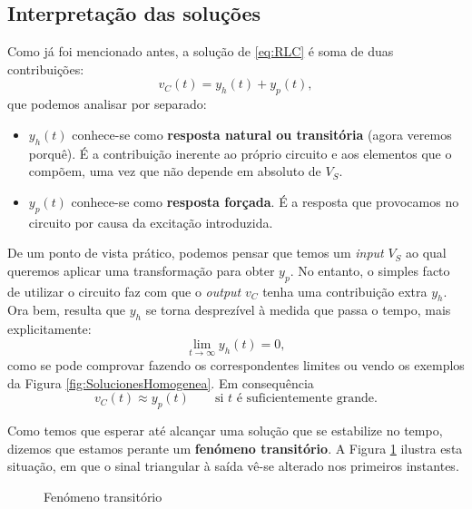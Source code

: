 \subsection{Interpretação  das soluções}
Como já foi mencionado antes, a solução de \eqref{eq:RLC} é soma de duas contribuições:
\[
v_C(t) = y_h(t) + y_p(t),
\]
que podemos analisar por separado:
\begin{itemize}
  \item $y_h(t)$ conhece-se como \textbf{resposta natural ou transitória} (agora veremos porquê). É a contribuição inerente ao próprio circuito e aos elementos que o compõem, uma vez que não depende em absoluto de $V_S$.
  \item $y_p(t)$ conhece-se como \textbf{resposta forçada}. É a resposta que provocamos no circuito por causa da excitação introduzida.
\end{itemize}
De um ponto de vista prático, podemos pensar que temos um \textit{input} $V_S$ ao qual queremos aplicar uma transformação para obter $y_p$. No entanto, o simples facto de utilizar o circuito faz com que o \textit{output} $v_C$ tenha uma contribuição extra $y_h$. Ora bem, resulta que $y_h$ se torna desprezível à medida que passa o tempo, mais explicitamente:
\[
\lim _{t\rightarrow \infty} y_h (t) = 0,
\]
como se pode comprovar fazendo os correspondentes limites ou vendo os exemplos da Figura \ref{fig:SolucionesHomogenea}. Em consequência
\begin{equation}
  \label{eq:aproximacionSolucionRLC}
  v_C(t) \approx y_p(t)\qquad \text{si }t \text{ é suficientemente grande}.
\end{equation}

Como temos que esperar até alcançar uma solução que se estabilize no tempo, dizemos que estamos perante um  \textbf{fenómeno transitório}. A Figura \ref{fig:Transitorio} ilustra esta situação, em que o sinal triangular à saída vê-se alterado nos primeiros instantes.

\begin{figure}
\begin{figurebox}
    \vspace{0pt}
    \centering
    \scalebox{0.4}{ }
    \vspace{-10pt}
    \caption{Fenómeno transitório}
    \label{fig:Transitorio}
\end{figurebox}
\end{figure}





